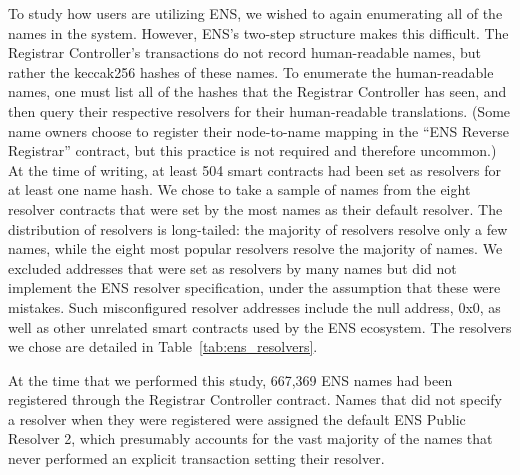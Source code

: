 To study how users are utilizing ENS, we wished to again 
enumerating all of the names in the system. However, ENS's 
two-step structure makes this difficult. The Registrar 
Controller's transactions do not record human-readable names, 
but rather the keccak256 hashes of these names. To enumerate 
the human-readable names, one must list all of the hashes 
that the Registrar Controller has seen, and then query their 
respective resolvers for their human-readable translations. 
(Some name owners choose to register their node-to-name 
mapping in the ``ENS Reverse Registrar'' 
contract, but this practice is not required and therefore 
uncommon.)
At the time of writing, at least 504 smart contracts had been 
set as resolvers for at least one name hash.
We chose to take a sample of names from the eight resolver 
contracts that were set by the most names as their default 
resolver. The distribution of resolvers is long-tailed: the 
majority of resolvers resolve only a few names, while the 
eight most popular resolvers resolve the majority of names. 
We excluded addresses that were set as resolvers 
by many names but did not implement the ENS resolver 
specification, under the assumption that these were mistakes. 
Such misconfigured resolver addresses 
include the null address, 
0x0, as well as other unrelated smart contracts used by the 
ENS ecosystem. The resolvers we chose are 
detailed in Table~\ref{tab:ens_resolvers}.

At the time that we performed this study, 667,369 ENS names had been 
registered through the Registrar Controller contract. Names that did not 
specify a resolver when they were registered 
were assigned the default ENS Public Resolver 2, which presumably accounts for 
the vast majority of the names that never performed an explicit transaction 
setting their resolver.  

